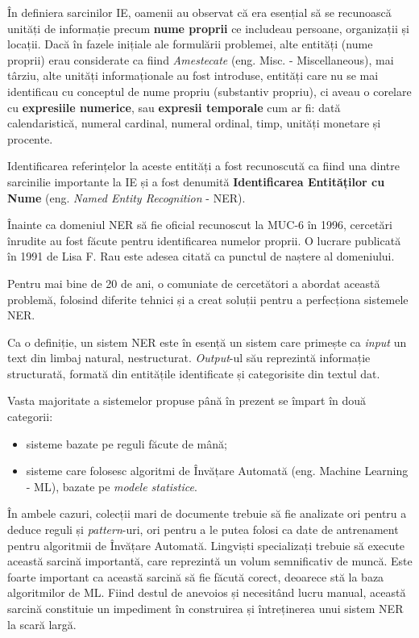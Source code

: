 În definiera sarcinilor IE, oamenii au observat că era esențial să se recunoască unități de informație precum \textbf{nume proprii} ce includeau persoane, organizații și locații. Dacă în fazele inițiale ale formulării problemei, alte entități (nume proprii) erau considerate ca fiind \textit{Amestecate} (eng. Misc. - Miscellaneous), mai târziu, alte unități informaționale au fost introduse, entități care nu se mai identificau cu conceptul de nume propriu (substantiv propriu), ci aveau o corelare cu \textbf{expresiile numerice}, sau \textbf{expresii temporale} cum ar fi: dată calendaristică, numeral cardinal, numeral ordinal, timp, unități monetare și procente.


Identificarea referințelor la aceste entități a fost recunoscută ca fiind una dintre sarcinilie importante la IE și a fost denumită \textbf{Identificarea Entităților cu Nume} (eng. \textit{Named Entity Recognition} - NER).


Înainte ca domeniul NER să fie oficial recunoscut la MUC-6 în 1996, cercetări înrudite au fost făcute pentru identificarea numelor proprii. O lucrare publicată în 1991 de Lisa F. Rau este adesea citată ca punctul de naștere al domeniului.\cite{rau1991}

Pentru mai bine de 20 de ani, o comuniate de cercetători a abordat această problemă, folosind diferite tehnici și a creat soluții pentru a perfecționa sistemele NER.

Ca o definiție, un sistem NER este în esență un sistem care primește ca \textit{input} un text din limbaj natural, nestructurat. \textit{Output}-ul său reprezintă informație structurată, formată din entitățile identificate și categorisite din textul dat.

Vasta majoritate a sistemelor propuse până în prezent se împart în două categorii:

\begin{itemize}
\item sisteme bazate pe reguli făcute de mână;
\item sisteme care folosesc algoritmi de Învățare Automată (eng. Machine Learning - ML), bazate pe \textit{modele statistice}.
\end{itemize}


În ambele cazuri, colecții mari de documente trebuie să fie analizate ori pentru a deduce reguli și \textit{pattern}-uri, ori pentru a le putea folosi ca date  de antrenament pentru algoritmii de Învățare Automată. Lingviști specializați trebuie să execute această sarcină importantă, care reprezintă un volum semnificativ de muncă. Este foarte important ca această sarcină să fie făcută corect, deoarece stă la baza algoritmilor de ML. Fiind destul de anevoios și necesitând lucru manual, această sarcină constituie un impediment în construirea și întreținerea unui sistem NER la scară largă.

